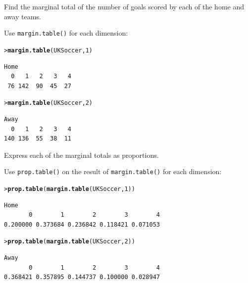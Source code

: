 \documentclass[10pt]{report}\usepackage[]{graphicx}\usepackage[]{color}
\makeatletter
\newcommand{\hlnum}[1]{\textcolor[rgb]{0.686,0.059,0.569}{#1}}%
\newcommand{\hlstd}[1]{\textcolor[rgb]{0.345,0.345,0.345}{#1}}%
\newcommand{\hlkwd}[1]{\textcolor[rgb]{0.737,0.353,0.396}{\textbf{#1}}}%
\newenvironment{kframe}{%
 \def\at@end@of@kframe{}%
 \ifinner\ifhmode%
  \def\at@end@of@kframe{\end{minipage}}%
  \begin{minipage}{\columnwidth}%
 \fi\fi%
 \def\FrameCommand##1{\hskip\@totalleftmargin \hskip-\fboxsep
 \colorbox{shadecolor}{##1}\hskip-\fboxsep
     \hskip-\linewidth \hskip-\@totalleftmargin \hskip\columnwidth}%
 \MakeFramed {\advance\hsize-\width
   \@totalleftmargin\z@ \linewidth\hsize
   \@setminipage}}%
 {\par\unskip\endMakeFramed%
 \at@end@of@kframe}
\newenvironment{knitrout}{}{} %
\renewenvironment{knitrout}{\small\renewcommand{\baselinestretch}{.85}}{} %
\makeatother
\begin{document}
\begin{Exercises}
\begin{enumerate*}
    \item Find the marginal total of the number of goals scored by each of
    the home and away teams.
    \begin{ans}
      Use \texttt{margin.table()} for each dimension:
\begin{knitrout}\footnotesize
{}\color{fgcolor}\begin{kframe}
\begin{alltt}
\hlstd{> }\hlkwd{margin.table}\hlstd{(UKSoccer,} \hlnum{1}\hlstd{)}
\end{alltt}
\begin{verbatim}
Home
  0   1   2   3   4 
 76 142  90  45  27 
\end{verbatim}
\begin{alltt}
\hlstd{> }\hlkwd{margin.table}\hlstd{(UKSoccer,} \hlnum{2}\hlstd{)}
\end{alltt}
\begin{verbatim}
Away
  0   1   2   3   4 
140 136  55  38  11 
\end{verbatim}
\end{kframe}
\end{knitrout}
    \end{ans}
    
    \item Express each of the marginal totals as proportions.
    \begin{ans}
      Use \texttt{prop.table()} on the result of \texttt{margin.table()} for each dimension:
\begin{knitrout}\footnotesize
{}\color{fgcolor}\begin{kframe}
\begin{alltt}
\hlstd{> }\hlkwd{prop.table}\hlstd{(}\hlkwd{margin.table}\hlstd{(UKSoccer,} \hlnum{1}\hlstd{))}
\end{alltt}
\begin{verbatim}
Home
       0        1        2        3        4 
0.200000 0.373684 0.236842 0.118421 0.071053 
\end{verbatim}
\begin{alltt}
\hlstd{> }\hlkwd{prop.table}\hlstd{(}\hlkwd{margin.table}\hlstd{(UKSoccer,} \hlnum{2}\hlstd{))}
\end{alltt}
\begin{verbatim}
Away
       0        1        2        3        4 
0.368421 0.357895 0.144737 0.100000 0.028947 
\end{verbatim}
\end{kframe}
\end{knitrout}
    \end{ans}
    

\end{enumerate*}
\end{Exercises}
\end{document}
